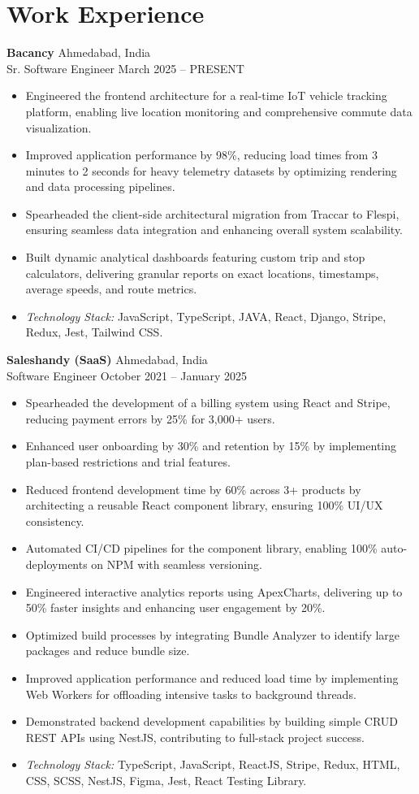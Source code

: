 \documentclass[letterpaper,10pt]{article}
\begin{document}
\section*{Work Experience}
\textbf{Bacancy} \hfill Ahmedabad, India \\
Sr. Software Engineer \hfill March 2025 – PRESENT
\begin{itemize}
    \item Engineered the frontend architecture for a real-time IoT vehicle tracking platform, enabling live location monitoring and comprehensive commute data visualization.
    \item Improved application performance by 98\%, reducing load times from 3 minutes to 2 seconds for heavy telemetry datasets by optimizing rendering and data processing pipelines.
    \item Spearheaded the client-side architectural migration from Traccar to Flespi, ensuring seamless data integration and enhancing overall system scalability.
    \item Built dynamic analytical dashboards featuring custom trip and stop calculators, delivering granular reports on exact locations, timestamps, average speeds, and route metrics.
    \item \textit{Technology Stack:} JavaScript, TypeScript, JAVA, React, Django, Stripe, Redux, Jest, Tailwind CSS.
\end{itemize}

\textbf{Saleshandy (SaaS)} \hfill Ahmedabad, India \\
Software Engineer \hfill October 2021 – January 2025
\begin{itemize}
    \item Spearheaded the development of a billing system using React and Stripe, reducing payment errors by 25\% for 3,000+ users.
    \item Enhanced user onboarding by 30\% and retention by 15\% by implementing plan-based restrictions and trial features.
    \item Reduced frontend development time by 60\% across 3+ products by architecting a reusable React component library, ensuring 100\% UI/UX consistency.
    \item Automated CI/CD pipelines for the component library, enabling 100\% auto-deployments on NPM with seamless versioning.
    \item Engineered interactive analytics reports using ApexCharts, delivering up to 50\% faster insights and enhancing user engagement by 20\%.
    \item Optimized build processes by integrating Bundle Analyzer to identify large packages and reduce bundle size.
    \item Improved application performance and reduced load time by implementing Web Workers for offloading intensive tasks to background threads.
    \item Demonstrated backend development capabilities by building simple CRUD REST APIs using NestJS, contributing to full-stack project success.
    \item \textit{Technology Stack:} TypeScript, JavaScript, ReactJS, Stripe, Redux, HTML, CSS, SCSS, NestJS, Figma, Jest, React Testing Library.
\end{itemize}
\end{document}
